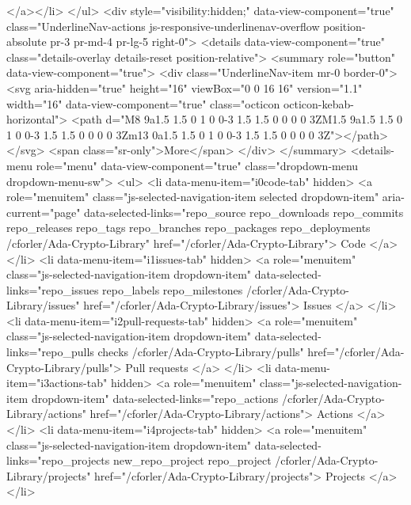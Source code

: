     
</a></li>
</ul>
    <div style="visibility:hidden;" data-view-component="true" class="UnderlineNav-actions js-responsive-underlinenav-overflow position-absolute pr-3 pr-md-4 pr-lg-5 right-0">      <details data-view-component="true" class="details-overlay details-reset position-relative">
  <summary role="button" data-view-component="true">          <div class="UnderlineNav-item mr-0 border-0">
            <svg aria-hidden="true" height="16" viewBox="0 0 16 16" version="1.1" width="16" data-view-component="true" class="octicon octicon-kebab-horizontal">
    <path d="M8 9a1.5 1.5 0 1 0 0-3 1.5 1.5 0 0 0 0 3ZM1.5 9a1.5 1.5 0 1 0 0-3 1.5 1.5 0 0 0 0 3Zm13 0a1.5 1.5 0 1 0 0-3 1.5 1.5 0 0 0 0 3Z"></path>
</svg>
            <span class="sr-only">More</span>
          </div>
</summary>
  <details-menu role="menu" data-view-component="true" class="dropdown-menu dropdown-menu-sw">          <ul>
              <li data-menu-item="i0code-tab" hidden>
                <a role="menuitem" class="js-selected-navigation-item selected dropdown-item" aria-current="page" data-selected-links="repo_source repo_downloads repo_commits repo_releases repo_tags repo_branches repo_packages repo_deployments /cforler/Ada-Crypto-Library" href="/cforler/Ada-Crypto-Library">
                  Code
</a>              </li>
              <li data-menu-item="i1issues-tab" hidden>
                <a role="menuitem" class="js-selected-navigation-item dropdown-item" data-selected-links="repo_issues repo_labels repo_milestones /cforler/Ada-Crypto-Library/issues" href="/cforler/Ada-Crypto-Library/issues">
                  Issues
</a>              </li>
              <li data-menu-item="i2pull-requests-tab" hidden>
                <a role="menuitem" class="js-selected-navigation-item dropdown-item" data-selected-links="repo_pulls checks /cforler/Ada-Crypto-Library/pulls" href="/cforler/Ada-Crypto-Library/pulls">
                  Pull requests
</a>              </li>
              <li data-menu-item="i3actions-tab" hidden>
                <a role="menuitem" class="js-selected-navigation-item dropdown-item" data-selected-links="repo_actions /cforler/Ada-Crypto-Library/actions" href="/cforler/Ada-Crypto-Library/actions">
                  Actions
</a>              </li>
              <li data-menu-item="i4projects-tab" hidden>
                <a role="menuitem" class="js-selected-navigation-item dropdown-item" data-selected-links="repo_projects new_repo_project repo_project /cforler/Ada-Crypto-Library/projects" href="/cforler/Ada-Crypto-Library/projects">
                  Projects
</a>              </li>
